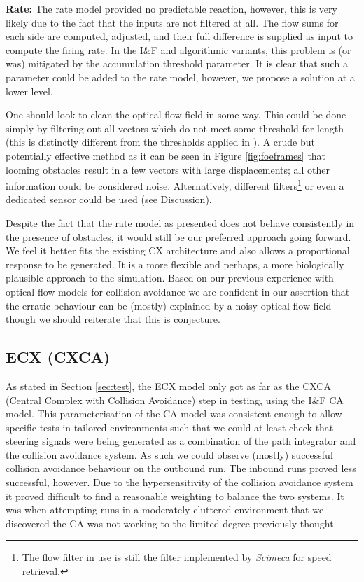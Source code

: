 \documentclass[a4paper,11pt,twoside,openright]{article}
\begin{document}
\textbf{Rate:} The rate model provided no predictable reaction,
however, this is very likely due to the fact that the inputs are not
filtered at all. The flow sums for each side are computed, adjusted,
and their full difference is supplied as input to compute the firing
rate. In the I\&F and algorithmic variants, this problem is (or was)
mitigated by the accumulation threshold parameter. It is clear that
such a parameter could be added to the rate model, however, we propose
a solution at a lower level.\newline\par

One should look to clean the optical flow field in some way. This
could be done simply by filtering out all vectors which do not meet
some threshold for length (this is distinctly different from the
thresholds applied in \cite{Mitchell2018}). A crude but potentially
effective method as it can be seen in Figure \ref{fig:foeframes} that
looming obstacles result in a few vectors with large displacements;
all other information could be considered noise. Alternatively,
different filters\footnote{The flow filter in use is still the filter
  implemented by \textit{Scimeca} for speed
  retrieval\cite{Scimeca2017,Mitchell2018}. } or even a dedicated
sensor could be used (see Discussion).\newline\par

Despite the fact that the rate model as presented does not behave
consistently in the presence of obstacles, it would still be our
preferred approach going forward. We feel it better fits the existing
CX architecture and also allows a proportional response to be
generated. It is a more flexible and perhaps, a more biologically
plausible approach to the simulation. Based on our previous experience
with optical flow models for collision avoidance we are confident in
our assertion that the erratic behaviour can be (mostly) explained by
a noisy optical flow field though we should reiterate that this is
conjecture.

\subsection{ECX (CXCA)}
As stated in Section \ref{sec:test}, the ECX model only got as far as
the CXCA (Central Complex with Collision Avoidance) step in testing,
using the I\&F CA model. This parameterisation of the CA model was
consistent enough to allow specific tests in tailored environments
such that we could at least check that steering signals were being
generated as a combination of the path integrator and the collision
avoidance system. As such we could observe (mostly) successful
collision avoidance behaviour on the outbound run. The inbound runs
proved less successful, however. Due to the hypersensitivity of the
collision avoidance system it proved difficult to find a reasonable
weighting to balance the two systems. It was when attempting runs in a
moderately cluttered environment that we discovered the CA was not
working to the limited degree previously thought.
\newline\par
\end{document}
